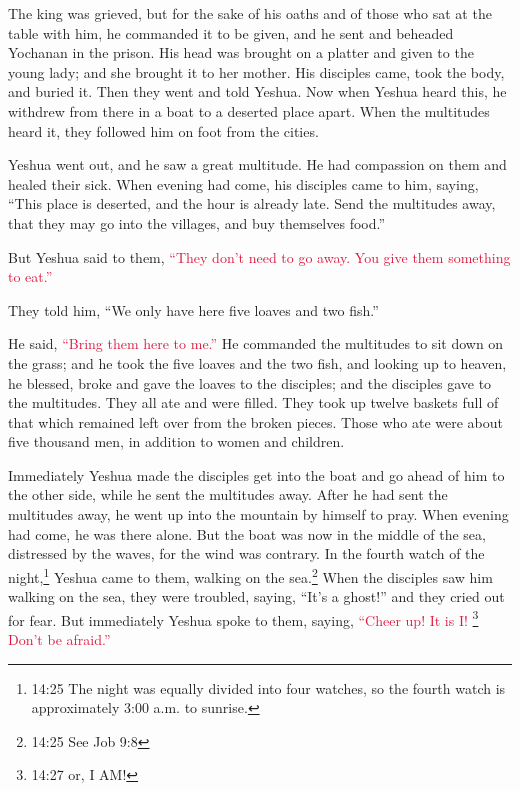 \myverse{}The king was grieved, but for the sake of his oaths and of those
who sat at the table with him, he commanded it to be given,
\myverse{}and he sent and beheaded Yochanan in the prison.
\myverse{}His head was brought on a platter and given to the young lady; and she brought
it to her mother.
\myverse{}His disciples came, took the body, and buried it. Then they went and told
Yeshua.
\myverse{}Now when Yeshua heard this, he withdrew from there in a boat to a deserted
place apart. When the multitudes heard it, they followed him on foot from the cities.

\myverse{}Yeshua went out, and he saw a great multitude. He had compassion
on them and healed their sick.
\myverse{}When evening had come, his disciples came to him, saying, “This place is
deserted, and the hour is already late. Send the multitudes away, that they may go into the villages,
and buy themselves food.”

\myverse{}But Yeshua said to them,
\textcolor{crimson}{“They don’t need to go away. You give them something to eat.”}

\myverse{}They told him, “We only have here five loaves and two fish.”

\myverse{}He said,
\textcolor{crimson}{“Bring them here to me.”}
\myverse{}He commanded the multitudes to sit down on the grass; and he took the five
loaves and the two fish, and looking up to heaven, he blessed, broke and gave the loaves to the disciples;
and the disciples gave to the multitudes.
\myverse{}They all ate and were filled. They took up twelve baskets full of that which
remained left over from the broken pieces.
\myverse{}Those who ate were about five thousand men, in addition to women and children.

\myverse{}Immediately Yeshua made the disciples get into the boat and
go ahead of him to the other side, while he sent the multitudes away.
\myverse{}After he had sent the multitudes away, he went up into the mountain by himself
to pray. When evening had come, he was there alone.
\myverse{}But the boat was now in the middle of the sea, distressed by the waves, for
the wind was contrary.
\myverse{}In the fourth watch of the night,\footnote{14:25 The night was equally divided into four watches, so the fourth watch is approximately 3:00 a.m.
	to sunrise.
} Yeshua came to them, walking on the sea.\footnote{14:25 See
	Job 9:8}
\myverse{}When the disciples saw him walking on the sea, they were troubled, saying,
“It’s a ghost!” and they cried out for fear.
\myverse{}But immediately Yeshua spoke to them, saying,
\textcolor{crimson}{“Cheer up! It is I!
}\footnote{14:27 or, I AM!}
\textcolor{crimson}{Don’t be afraid.”}

